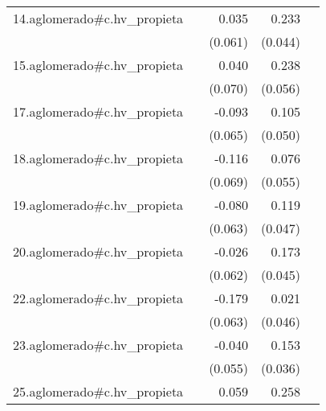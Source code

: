 {\begin{longtable}{l*{4}{D{.}{.}{-1}}}
\addlinespace
14.aglomerado#c.hv\_propieta&                     &       0.035         &       0.233\sym{***}&                     \\
            &                     &     (0.061)         &     (0.044)         &                     \\
\addlinespace
15.aglomerado#c.hv\_propieta&                     &       0.040         &       0.238\sym{***}&                     \\
            &                     &     (0.070)         &     (0.056)         &                     \\
\addlinespace
17.aglomerado#c.hv\_propieta&                     &      -0.093         &       0.105\sym{*}  &                     \\
            &                     &     (0.065)         &     (0.050)         &                     \\
\addlinespace
18.aglomerado#c.hv\_propieta&                     &      -0.116         &       0.076         &                     \\
            &                     &     (0.069)         &     (0.055)         &                     \\
\addlinespace
19.aglomerado#c.hv\_propieta&                     &      -0.080         &       0.119\sym{*}  &                     \\
            &                     &     (0.063)         &     (0.047)         &                     \\
\addlinespace
20.aglomerado#c.hv\_propieta&                     &      -0.026         &       0.173\sym{***}&                     \\
            &                     &     (0.062)         &     (0.045)         &                     \\
\addlinespace
22.aglomerado#c.hv\_propieta&                     &      -0.179\sym{**} &       0.021         &                     \\
            &                     &     (0.063)         &     (0.046)         &                     \\
\addlinespace
23.aglomerado#c.hv\_propieta&                     &      -0.040         &       0.153\sym{***}&                     \\
            &                     &     (0.055)         &     (0.036)         &                     \\
\addlinespace
25.aglomerado#c.hv\_propieta&                     &       0.059         &       0.258\sym{***}&                     \\

\end{longtable}}
